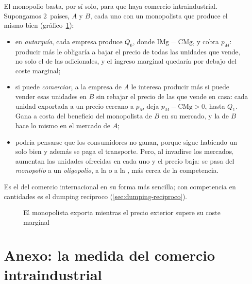 \documentclass[11pt]{article}
\begin{document}
El monopolio basta, por sí solo, para que haya comercio intraindustrial. Supongamos 2~países, $A$ y $B$, cada uno con un monopolista que produce el mismo bien (gráfico~\ref{fig:monopolio-procompetitivo}):
\begin{itemize}
\item en \emph{autarquía}, cada empresa produce $Q_0$, donde $\mathrm{IMg}=\mathrm{CMg}$, y cobra $p_M$: producir más le obligaría a bajar el precio de todas las unidades que vende, no solo el de las adicionales, y el ingreso marginal quedaría por debajo del coste marginal;
\item si puede \emph{comerciar}, a la empresa de $A$ le interesa producir más si puede vender esas unidades en $B$ sin rebajar el precio de las que vende en casa: cada unidad exportada a un precio cercano a $p_M$ deja $p_M-\mathrm{CMg}>0$, hasta $Q_1$. Gana a costa del beneficio del monopolista de $B$ en su mercado, y la de $B$ hace lo mismo en el mercado de $A$;
\item podría pensarse que los consumidores no ganan, porque sigue habiendo un solo bien y además se paga el transporte. Pero, al invadirse los mercados, aumentan las unidades ofrecidas en cada uno y el precio baja: se pasa del \emph{monopolio} a un \emph{oligopolio}, a la  o a la , más cerca de la competencia.
\end{itemize}
Es el  del comercio internacional en su forma más sencilla; con competencia en cantidades es el dumping recíproco (\ref{sec:dumping-reciproco}).
\begin{figure}[H]
\centering
\caption{El monopolista exporta mientras el precio exterior supere su coste marginal}\label{fig:monopolio-procompetitivo}
\end{figure}

\section{Anexo: la medida del comercio intraindustrial}\label{anexo:intraindustrial}
\end{document}
